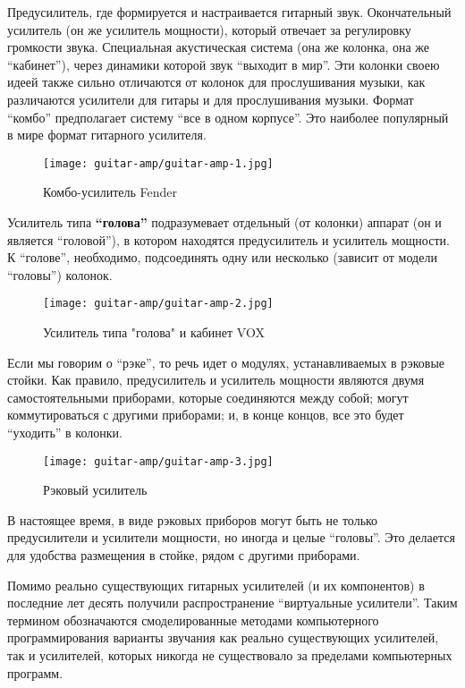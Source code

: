 Предусилитель, где формируется и настраивается гитарный звук.
Окончательный усилитель (он же усилитель мощности), который отвечает за регулировку громкости звука.
Специальная акустическая система (она же колонка, она же “кабинет”), через динамики которой звук “выходит в мир”. Эти колонки своею идеей также сильно отличаются от колонок для прослушивания музыки, как различаются усилители для гитары и для прослушивания музыки.
Формат “комбо” предполагает систему “все в одном корпусе”. Это наиболее популярный в мире формат гитарного усилителя.
\begin{figure}[h]
\texttt{[image: guitar-amp/guitar-amp-1.jpg]}
\caption{Комбо-усилитель Fender}
\label{guitar-amp:1}
\end{figure}
Усилитель типа \textbf{“голова”} подразумевает отдельный (от колонки) аппарат (он и является “головой”), в котором находятся предусилитель и усилитель мощности. К “голове”, необходимо, подсоединять одну или несколько (зависит от модели “головы”) колонок.
\begin{figure}[h]
\texttt{[image: guitar-amp/guitar-amp-2.jpg]}
\caption{Усилитель типа "голова" и кабинет VOX}
\label{guitar-amp:2}
\end{figure}
Если мы говорим о “рэке”, то речь идет о модулях, устанавливаемых в рэковые стойки. Как правило, предусилитель и усилитель мощности являются двумя самостоятельными приборами, которые соединяются между собой; могут коммутироваться с другими приборами; и, в конце концов, все это будет “уходить” в колонки.
\begin{figure}[h]
\texttt{[image: guitar-amp/guitar-amp-3.jpg]}
\caption{Рэковый усилитель}
\label{guitar-amp:3}
\end{figure}
В настоящее время, в виде рэковых приборов могут быть не только предусилители и усилители мощности, но иногда и целые “головы”. Это делается для удобства размещения в стойке, рядом с другими приборами.

Помимо реально существующих гитарных усилителей (и их компонентов) в последние лет десять получили распространение “виртуальные усилители”. Таким термином обозначаются смоделированные методами компьютерного программирования варианты звучания как реально существующих усилителей, так и усилителей, которых никогда не существовало за пределами компьютерных программ.

